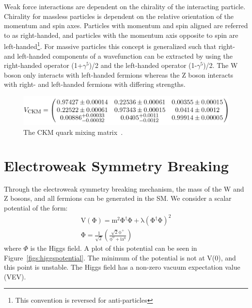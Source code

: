 Weak force interactions are dependent on the chirality of the interacting particle.
Chirality for massless particles is dependent on the relative orientation of the momentum and spin axes.  
Particles with momentum and spin aligned are referred to as right-handed, and particles with the momentum 
axis opposite to spin are left-handed\footnote{This convention is reversed for anti-particles}.
For massive particles this concept is generalized such that right- and left-handed components of a wavefunction 
can be extracted by using the right-handed operator (1+$\gamma^5$)/2 and the left-handed operator (1-$\gamma^5$)/2.  
The W boson only interacts with left-handed fermions whereas the Z boson interacts with right- and left-handed fermions with differing strengths. 

\begin{figure}
\begin{center}
\includegraphics[width=1.0\linewidth]{figs/CKM.png}
\caption{The CKM quark mixing matrix~\cite{PDG-2014}.}
\label{figs:CKM}
\end{center}
\end{figure}



\section{Electroweak Symmetry Breaking}
Through the electroweak symmetry breaking mechanism, the mass of the W and Z bosons, and all fermions can be generated in the SM.  
We consider a scalar potential of the form:
\begin{eqnarray}
\mathrm{ V(\Phi) = m^{2} \Phi^{\dagger} \Phi + \lambda ( \Phi^{\dagger} \Phi )^{2}  }\\
\mathrm{\Phi = \frac{1}{\sqrt{2}} \left( \frac{\sqrt{2} \phi^{+}}{\phi^{0} + ia^{0}}  \right)}
\end{eqnarray}  
where $\Phi$ is the Higgs field.  A plot of this potential can be seen in Figure~\ref{figs:higgspotential}.  
The minimum of the potential is not at V(0), and this point is unstable.  
The Higgs field has a non-zero vacuum expectation value (VEV).

